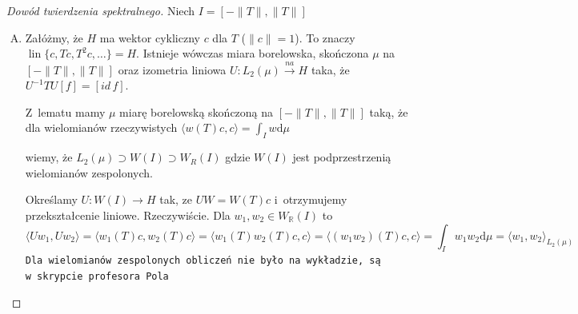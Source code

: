 \documentclass[11pt]{mwrep}
\renewcommand{\[}{\begin{equation}}
\renewcommand{\]}{\end{equation}}
\newcommand{\R}{{\ensuremath{\mathbb R}}}
\newcommand{\lin}{\operatorname{lin}}
\newcommand{\dd}{\mathrm{d}}
\newcounter{numer}
\begin{document}
\begin{proof}[Dowód twierdzenia spektralnego]%
	Niech $I = \left[ -\|T\|, \|T\| \right]$
	\begin{enumerate}[(A)]
		\item Załóżmy, że $H$ ma wektor cykliczny $c$ dla $T$ ($\|c\|=1$). To znaczy $\lin\{c, Tc, T^2c,\ldots\} = H$.
			Istnieje wówczas miara borelowska, skończona $\mu$ na $\left[ -\|T\|, \|T\| \right]$ oraz izometria liniowa
			$U \colon L_2 (\mu) \stackrel{na}{\to}H$ taka, że $U^{-1}TU[f] = [id\, f]$.\par
			Z~lematu mamy $\mu$ miarę borelowską skończoną na $\left[ -\|T\|, \|T\| \right]$ taką, że dla wielomianów rzeczywistych 
			$\langle w(T)c,c \rangle= \int_I w \dd \mu$\par
			wiemy, że 
			$L_2(\mu) \supset W(I) \supset W_R(I)$ gdzie $W(I)$ jest podprzestrzenią wielomianów zespolonych. \par
			Określamy $U\colon W(I) \to H$ tak, ze $UW = W(T)c$ i~otrzymujemy przekształcenie liniowe.
			Rzeczywiście. Dla $w_1, w_2 \in W_\R(I)$ to 
			$$\langle Uw_1, Uw_2 \rangle= \langle w_1 (T) c, w_2(T) c \rangle = \langle w_1(T)w_2(T)c,c  \rangle = 
			\langle (w_1w_2)(T) c,c \rangle = \int_I w_1 w_2 \dd \mu = \langle w_1, w_2  \rangle_{L_2(\mu)} $$
			\texttt{Dla wielomianów zespolonych obliczeń nie było na wykładzie, są w~skrypcie profesora Pola}\par


\end{enumerate}
\end{proof}
\end{document}
